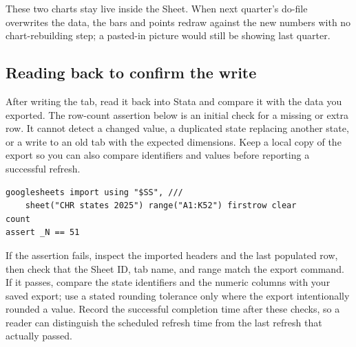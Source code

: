 These two charts stay live inside the Sheet. When next quarter's do-file overwrites the data, the bars and points redraw against the new numbers with no chart-rebuilding step; a pasted-in picture would still be showing last quarter.

\subsection{Reading back to confirm the write}
After writing the tab, read it back into Stata and compare it with the data you exported. The row-count assertion below is an initial check for a missing or extra row. It cannot detect a changed value, a duplicated state replacing another state, or a write to an old tab with the expected dimensions. Keep a local copy of the export so you can also compare identifiers and values before reporting a successful refresh.
\par
{\footnotesize
\begin{verbatim}
googlesheets import using "$SS", ///
    sheet("CHR states 2025") range("A1:K52") firstrow clear
count
assert _N == 51
\end{verbatim}
}
If the assertion fails, inspect the imported headers and the last populated row, then check that the Sheet ID, tab name, and range match the export command. If it passes, compare the state identifiers and the numeric columns with your saved export; use a stated rounding tolerance only where the export intentionally rounded a value. Record the successful completion time after these checks, so a reader can distinguish the scheduled refresh time from the last refresh that actually passed.


